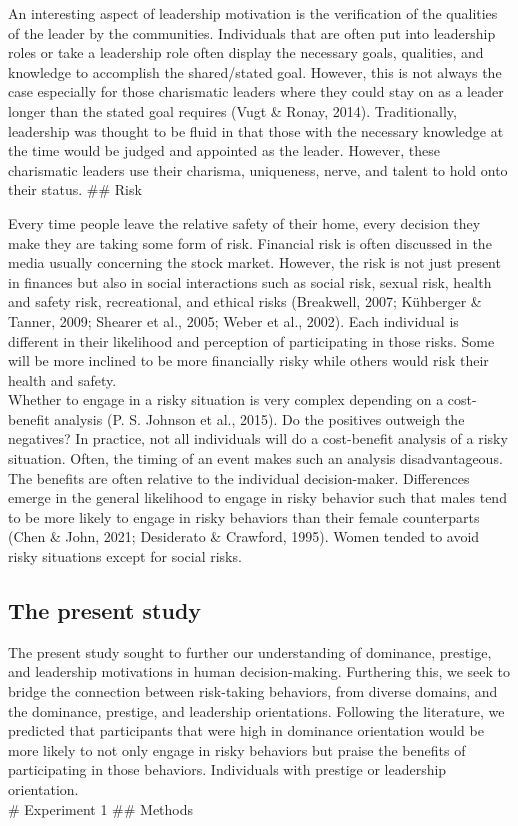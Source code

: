 \documentclass[
  donotrepeattitle,doc, 12pt, a4paper,floatsintext]{apa7}
\begin{document}
An interesting aspect of leadership motivation is the verification of the qualities of the leader by the communities. Individuals that are often put into leadership roles or take a leadership role often display the necessary goals, qualities, and knowledge to accomplish the shared/stated goal. However, this is not always the case especially for those charismatic leaders where they could stay on as a leader longer than the stated goal requires (Vugt \& Ronay, 2014). Traditionally, leadership was thought to be fluid in that those with the necessary knowledge at the time would be judged and appointed as the leader. However, these charismatic leaders use their charisma, uniqueness, nerve, and talent to hold onto their status.
\#\# Risk

Every time people leave the relative safety of their home, every decision they make they are taking some form of risk. Financial risk is often discussed in the media usually concerning the stock market. However, the risk is not just present in finances but also in social interactions such as social risk, sexual risk, health and safety risk, recreational, and ethical risks (Breakwell, 2007; Kühberger \& Tanner, 2009; Shearer et al., 2005; Weber et al., 2002). Each individual is different in their likelihood and perception of participating in those risks. Some will be more inclined to be more financially risky while others would risk their health and safety.\\

Whether to engage in a risky situation is very complex depending on a cost-benefit analysis (P. S. Johnson et al., 2015). Do the positives outweigh the negatives? In practice, not all individuals will do a cost-benefit analysis of a risky situation. Often, the timing of an event makes such an analysis disadvantageous. The benefits are often relative to the individual decision-maker. Differences emerge in the general likelihood to engage in risky behavior such that males tend to be more likely to engage in risky behaviors than their female counterparts (Chen \& John, 2021; Desiderato \& Crawford, 1995). Women tended to avoid risky situations except for social risks.

\hypertarget{the-present-study}{%
\subsection{The present study}\label{the-present-study}}

The present study sought to further our understanding of dominance, prestige, and leadership motivations in human decision-making. Furthering this, we seek to bridge the connection between risk-taking behaviors, from diverse domains, and the dominance, prestige, and leadership orientations. Following the literature, we predicted that participants that were high in dominance orientation would be more likely to not only engage in risky behaviors but praise the benefits of participating in those behaviors. Individuals with prestige or leadership orientation.\\
\# Experiment 1
\#\# Methods
\end{document}

